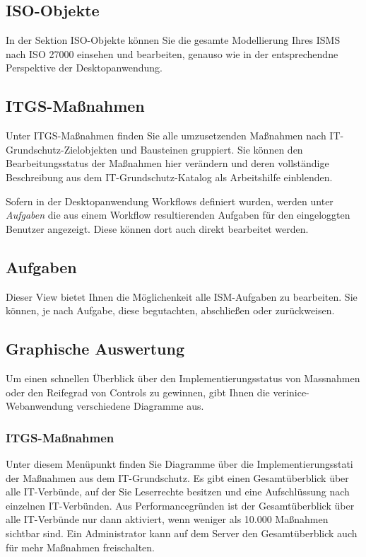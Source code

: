 \documentclass[a4paper,10pt]{book}
\begin{document}
\subsection{ISO-Objekte}

In der Sektion ISO-Objekte können Sie die gesamte Modellierung Ihres ISMS nach
ISO 27000 einsehen und bearbeiten, genauso wie in der entsprechendne Perspektive
der Desktopanwendung.


\subsection{ITGS-Maßnahmen}

Unter ITGS-Maßnahmen finden Sie alle umzusetzenden Maßnahmen nach
IT-Grundschutz-Zielobjekten und Bausteinen gruppiert. Sie können den
Bearbeitungsstatus der Maßnahmen hier verändern und deren vollständige
Beschreibung aus dem IT-Grundschutz-Katalog als Arbeitshilfe einblenden.

Sofern in der Desktopanwendung Workflows definiert wurden, werden unter
\textit{Aufgaben} die aus einem Workflow resultierenden Aufgaben für den
eingeloggten Benutzer angezeigt. Diese können dort auch direkt bearbeitet
werden.


\subsection{Aufgaben}
\label{sec:aufgaben}

Dieser View bietet Ihnen die Möglichenkeit alle ISM-Aufgaben zu
bearbeiten. Sie können, je nach Aufgabe, diese begutachten,
abschließen oder zurückweisen.

\subsection{Graphische Auswertung}

Um einen schnellen Überblick über den Implementierungsstatus von
Massnahmen oder den Reifegrad von Controls zu gewinnen, gibt Ihnen die
verinice-Web\-an\-wendung verschiedene Diagramme aus.

\subsubsection{ITGS-Maßnahmen}
\label{sec:itgs-massnahmen}

Unter diesem Menüpunkt finden Sie Diagramme über die
Implementierungsstati der Maßnahmen aus dem IT-Grundschutz. Es gibt
einen Gesamtüberblick über alle IT-Verbünde, auf der Sie Leserrechte
besitzen und eine Aufschlüssung nach einzelnen IT-Verbünden. Aus 
Performancegründen ist der Gesamtüberblick über alle IT-Verbünde nur dann 
aktiviert, wenn weniger als 10.000 Maßnahmen sichtbar sind. Ein 
Administrator kann auf dem Server den Gesamtüberblick auch für mehr 
Maßnahmen freischalten.
\end{document}
